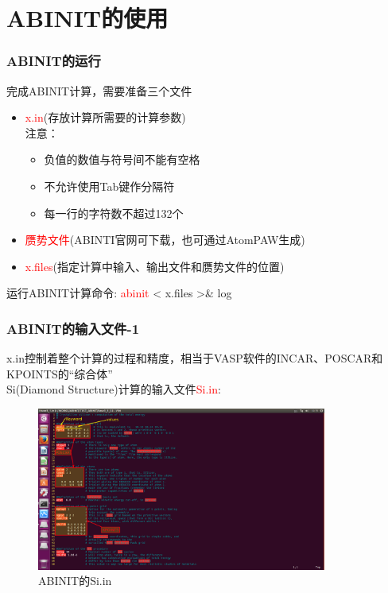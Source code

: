 \documentclass[cjk,slidestop,compress,mathserif,blue]{beamer}
\begin{document}
\section{ABINIT的使用}
\frame
{
	\frametitle{ABINIT的运行}
	完成\textrm{ABINIT}计算，需要准备三个文件
\begin{itemize}
        \setlength{\itemsep}{15pt} %
		\item \textcolor{red}{x.in}\hspace{3pt}(存放计算所需要的计算参数)\\
			注意：\begin{itemize}
				\item 负值的数值与符号间不能有空格
				\item 不允许使用Tab键作分隔符
				\item 每一行的字符数不超过132个
			\end{itemize}
		\item \textcolor{red}{赝势文件}\hspace{3pt}(\textrm{ABINTI}官网可下载，也可通过\textrm{AtomPAW}生成)
		\item \textcolor{red}{x.files}\hspace{3pt}(指定计算中输入、输出文件和赝势文件的位置)
\end{itemize}
	\vspace{15pt}
	运行\textrm{ABINIT}计算命令:\hspace{10pt}
	\textcolor{red}{abinit} < x.files >\& log 
}

\frame
{
	\frametitle{ABINIT的输入文件-1}
	\textrm{x.in}控制着整个计算的过程和精度，相当于\textrm{VASP}软件的\textrm{INCAR}、\textrm{POSCAR}和\textrm{KPOINTS}的“综合体”\\
	Si(Diamond Structure)计算的输入文件\textcolor{red}{Si.in}:
\begin{figure}[h!]
\centering
\vspace{-4.5pt}
\includegraphics[height=0.6524\textwidth,width=0.85\textwidth,viewport=70 360 775 875,clip]{Figures/2016-06-28_Si-1.png}
\caption{\textrm{ABINIT}的Si.in}
\label{X.in-1}
\end{figure}
}
\end{document}
